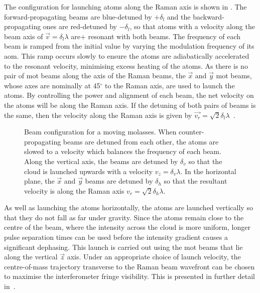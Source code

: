The configuration for launching atoms along the Raman axis is shown in . The forward-propagating beams are blue-detuned by \(+\delta_l\) and the backward-propagating ones are red-detuned by \(-\delta_l\), so that atoms with a velocity along the beam axis of \(\vec{v} = \delta_l \lambda\) are+ resonant with both beams. The frequency of each beam is ramped from the initial value by varying the modulation frequency of its \ac{aom}. This ramp occurs slowly to ensure the atoms are adiabatically accelerated to the resonant velocity, minimising excess heating of the atoms. As there is no pair of \ac{mot} beams along the axis of the Raman beams, the \(\vec{x}\) and \(\vec{y}\) \ac{mot} beams, whose axes are nominally at 45\(^{\circ}\) to the Raman axis, are used to launch the atoms. By controlling the power and alignment of each beam, the net velocity on the atoms will be along the Raman axis. If the detuning of both pairs of beams is the same, then the velocity along the Raman axis is given by \(\vec{v_r} = \sqrt{2} \delta_l \lambda\)~\nocite{Ohshima1995}.
\begin{figure}[!htbp]
    \centering
    \def\svgwidth{0.6\textwidth}
    \caption[Beam configuration for a moving molasses]{Beam configuration for a moving molasses. When counter-propagating beams are detuned from each other, the atoms are slowed to a velocity which balances the frequency of each beam. Along the vertical axis, the beams are detuned by \(\delta_v\) so that the cloud is launched upwards with a velocity \(v_z = \delta_v \lambda\). In the horizontal plane, the \(\vec{x}\) and \(\vec{y}\) beams are detuned by \(\delta_h\) so that the resultant velocity is along the Raman axis \(v_r = \sqrt{2}\delta_h\lambda\). }
    \label{fig:moving_molasses}
\end{figure}
\par\noindent
As well as launching the atoms horizontally, the atoms are launched vertically so that they do not fall as far under gravity. Since the atoms remain close to the centre of the beam, where the intensity across the cloud is more uniform, longer pulse separation times can be used before the intensity gradient causes a significant dephasing. This launch is carried out using the \ac{mot} beams that lie along the vertical \(\vec{z}\) axis. Under an appropriate choice of launch velocity, the centre-of-mass trajectory transverse to the Raman beam wavefront can be chosen to maximise the interferometer fringe visibility. This is presented in further detail in~. 
\par\noindent
